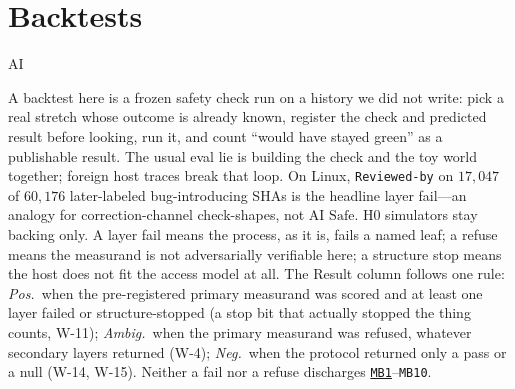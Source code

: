 \authbarneedspace
\section{Backtests}
\label{sec:appn-backtests}
\begin{authbar}{AI}

A backtest here is a frozen safety check run on a history we did not write: pick a real stretch whose outcome is already known, register the check and predicted result before looking, run it, and count ``would have stayed green'' as a publishable result.
The usual eval lie is building the check and the toy world together; foreign host traces break that loop.
On Linux, \texttt{Reviewed-by} on $17{,}047$ of $60{,}176$ later-labeled bug-introducing SHAs is the headline layer fail---an analogy for correction-channel check-shapes, not AI $\mathrm{Safe}$.
H0 simulators stay backing only.
A layer fail means the process, as it is, fails a named leaf; a refuse means the measurand is not adversarially verifiable here; a structure stop means the host does not fit the access model at all.
The Result column follows one rule: \emph{Pos.}\ when the pre-registered primary measurand was scored and at least one layer failed or structure-stopped (a stop bit that actually stopped the thing counts, W-11); \emph{Ambig.}\ when the primary measurand was refused, whatever secondary layers returned (W-4); \emph{Neg.}\ when the protocol returned only a pass or a null (W-14, W-15).
Neither a fail nor a refuse discharges \hyperref[appbridge-crosswalk]{\texttt{MB1}}--\texttt{MB10}.

\small
\setlength{\tabcolsep}{3pt}
\renewcommand{\arraystretch}{1.2}
\end{authbar}
